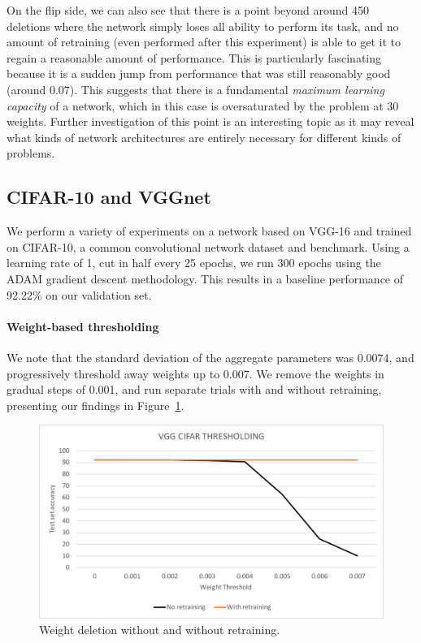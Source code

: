 \documentclass[10pt,twocolumn,letterpaper]{article}
\begin{document}
On the flip side, we can also see that there is a point beyond around 450 deletions where the network simply loses all ability to perform its task, and no amount of retraining (even performed after this experiment) is able to get it to regain a reasonable amount of performance.
This is particularly fascinating because it is a sudden jump from performance that was still reasonably good (around 0.07).
This suggests that there is a fundamental \emph{maximum learning capacity} of a network, which in this case is oversaturated by the problem at 30 weights.
Further investigation of this point is an interesting topic as it may reveal what kinds of network architectures are entirely necessary for different kinds of problems.

\subsection{CIFAR-10 and VGGnet}
We perform a variety of experiments on a network based on VGG-16 and trained on CIFAR-10, a common convolutional network dataset and benchmark.
Using a learning rate of 1, cut in half every 25 epochs, we run 300 epochs using the ADAM gradient descent methodology.
This results in a baseline performance of 92.22\% on our validation set.


\paragraph{Weight-based thresholding}
We note that the standard deviation of the aggregate parameters was 0.0074, and progressively threshold away weights up to 0.007.
We remove the weights in gradual steps of 0.001, and run separate trials with and without retraining, presenting our findings in Figure~\ref{fig:vgg-thresh}.
\begin{figure}[h]
  \centering
  \includegraphics[width=\linewidth]{cifar-threshold.pdf}
  \caption{Weight deletion without and without retraining.}
  \label{fig:vgg-thresh}
\end{figure}
\end{document}
